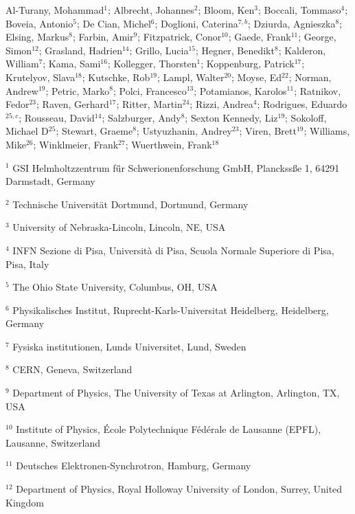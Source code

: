 Al-Turany, Mohammad$^{1}$;
Albrecht, Johannes$^{2}$;
Bloom, Ken$^{3}$;
Boccali, Tommaso$^{4}$;
Boveia, Antonio$^{5}$;
De Cian, Michel$^{6}$;
Doglioni, Caterina$^{7,b}$;
Dziurda, Agnieszka$^{8}$;
Elsing, Markus$^{8}$;
Farbin, Amir$^{9}$;
Fitzpatrick, Conor$^{10}$;
Gaede, Frank$^{11}$;
George, Simon$^{12}$;
Grasland, Hadrien$^{14}$;
Grillo, Lucia$^{15}$;
Hegner, Benedikt$^{8}$;
Kalderon, William$^{7}$;
Kama, Sami$^{16}$;
Kollegger, Thorsten$^{1}$;
Koppenburg, Patrick$^{17}$;
Krutelyov, Slava$^{18}$;
Kutschke, Rob$^{19}$;
Lampl, Walter$^{20}$;
Moyse, Ed$^{22}$;
Norman, Andrew$^{19}$;
Petric, Marko$^{8}$;
Polci, Francesco$^{13}$;
Potamianos, Karolos$^{11}$;
Ratnikov, Fedor$^{23}$;
Raven, Gerhard$^{17}$;
Ritter, Martin$^{24}$;
Rizzi, Andrea$^{4}$;
Rodrigues, Eduardo$^{25,c}$;
Rousseau, David$^{14}$;
Salzburger, Andy$^{8}$;
Sexton Kennedy, Liz$^{19}$;
Sokoloff, Michael D$^{25}$;
Stewart, Graeme$^{8}$;
Ustyuzhanin, Andrey$^{23}$;
Viren, Brett$^{19}$;
Williams, Mike$^{26}$;
Winklmeier, Frank$^{27}$;
Wuerthwein, Frank$^{18}$
\bigskip 
\par {\footnotesize $^{1}$ GSI Helmholtzzentrum f\"ür Schwerionenforschung GmbH, Planckssße 1, 64291 Darmstadt, Germany}
\par {\footnotesize $^{2}$ Technische Universit\"at Dortmund, Dortmund, Germany}
\par {\footnotesize $^{3}$ University of Nebraska-Lincoln, Lincoln, NE, USA}
\par {\footnotesize $^{4}$ INFN Sezione di Pisa, Università di Pisa, Scuola Normale Superiore di Pisa, Pisa, Italy}
\par {\footnotesize $^{5}$ The Ohio State University, Columbus, OH, USA}
\par {\footnotesize $^{6}$ Physikalisches Institut, Ruprecht-Karls-Universitat Heidelberg, Heidelberg, Germany}
\par {\footnotesize $^{7}$ Fysiska institutionen, Lunds Universitet, Lund, Sweden}
\par {\footnotesize $^{8}$ CERN, Geneva, Switzerland}
\par {\footnotesize $^{9}$ Department of Physics, The University of Texas at Arlington, Arlington, TX, USA}
\par {\footnotesize $^{10}$ Institute of Physics, École Polytechnique Fédérale de Lausanne (EPFL), Lausanne, Switzerland}
\par {\footnotesize $^{11}$ Deutsches Elektronen-Synchrotron, Hamburg, Germany}
\par {\footnotesize $^{12}$ Department of Physics, Royal Holloway University of London, Surrey, United Kingdom}
